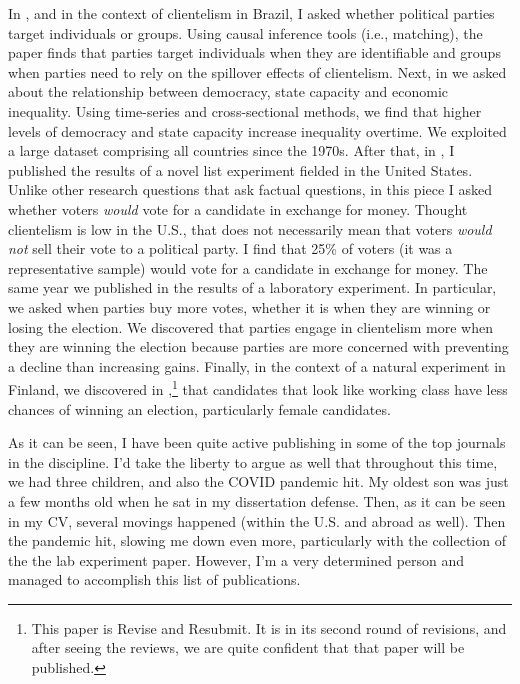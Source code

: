\documentclass[10pt,stdletter,dateno,sigleft]{newlfm} %
\begin{document}
\begin{newlfm}
In \href{https://doi.org/10.1177/1866802X1801000202}{\textcite{Bahamonde2018}}, and in the context of clientelism in Brazil, I asked whether political parties target individuals or groups. Using causal inference tools (i.e., matching), the paper finds that parties target individuals when they are identifiable and groups when parties need to rely on the spillover effects of clientelism. Next, in \href{https://doi.org/10.1016/j.ejpoleco.2021.102048}{\textcite{Bahamonde2021a}} we asked about the relationship between democracy, state capacity and economic inequality. Using time-series and cross-sectional methods, we find that higher levels of democracy and state capacity increase inequality overtime. We exploited a large dataset comprising all countries since the 1970s. After that, in \href{https://link.springer.com/article/10.1057/s41269-020-00174-4}{\textcite{Bahamonde2020a}}, I published the results of a novel list experiment fielded in the United States. Unlike other research questions that ask factual questions, in this piece I asked whether voters \emph{would} vote for a candidate in exchange for money. Thought clientelism is low in the U.S., that does not necessarily mean that voters \emph{would not} sell their vote to a political party. I find that 25\% of voters (it was a representative sample) would vote for a candidate in exchange for money. The same year we published in \href{https://doi.org/10.1016/j.electstud.2022.102497}{\textcite{Bahamonde2022b}} the results of a laboratory experiment. In particular, we asked when parties buy more votes, whether it is when they are winning or losing the election. We discovered that parties engage in clientelism more when they are winning the election because parties are more concerned with preventing a decline than increasing gains. Finally, in the context of a natural experiment in Finland, we discovered in \textcite{Bahamonde:2023},\footnote{This paper is Revise and Resubmit. It is in its second round of revisions, and after seeing the reviews, we are quite confident that that paper will be published.}  that candidates that look like working class have less chances of winning an election, particularly female candidates.

As it can be seen, I have been quite active publishing in some of the top journals in the discipline. I'd take the liberty to argue as well that throughout this time, we had three children, and also the COVID pandemic hit. My oldest son was just a few months old when he sat in my dissertation defense. Then, as it can be seen in my CV, several movings happened (within the U.S. and abroad as well). Then the pandemic hit, slowing me down even more, particularly with the collection of the the lab experiment paper. However, I'm a very determined person and managed to accomplish this list of publications. 


\end{newlfm}
\end{document}
